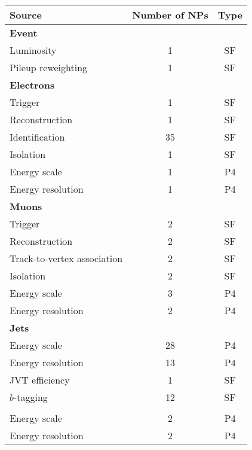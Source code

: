 \begin{tabular}{l c c}
    \toprule
    Source & Number of NPs & Type \\
    \midrule
    \textbf{Event} & & \\
    \midrule
    Luminosity \cite{ATLAS-CONF-2019-021} & 1 & SF \\
    Pileup reweighting & 1 & SF \\
    \midrule
    \textbf{Electrons} \cite{EGAM-2018-01} & & \\
    \midrule
    Trigger \cite{TRIG-2018-05} & 1 & SF \\
    Reconstruction & 1 & SF \\
    Identification & 35 & SF \\
    Isolation & 1 & SF \\
    Energy scale & 1 & P4 \\
    Energy resolution & 1 & P4 \\
    \midrule
    \textbf{Muons} \cite{MUON-2018-03} & &  \\
    \midrule
    Trigger \cite{TRIG-2018-01} & 2 & SF \\
    Reconstruction & 2 & SF \\
    Track-to-vertex association & 2 & SF \\
    Isolation & 2 & SF \\
    Energy scale & 3 & P4 \\
    Energy resolution & 2 & P4 \\
    \midrule
    \textbf{Jets} \cite{JETM-2018-05} & & \\
    \midrule
    Energy scale & 28 & P4 \\
    Energy resolution & 13 & P4\\
    JVT efficiency \cite{ATLAS-CONF-2014-018} & 1 & SF \\
    $b$-tagging \cite{FTAG-2018-01} & 12 & SF \\
    \midrule
    \pmb{\MET} \cite{PERF-2016-07} & & \\
    \midrule
    Energy scale & 2 & P4 \\
    Energy resolution & 2 & P4 \\
    \bottomrule
\end{tabular}
